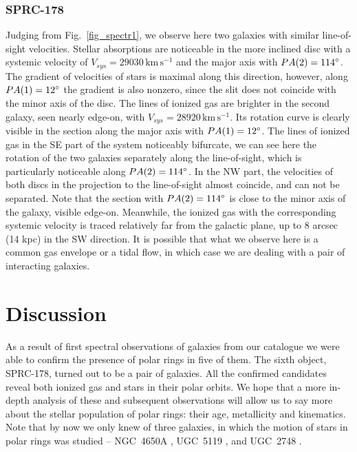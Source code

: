 \documentclass[useAMS,usenatbib]{mn2e}
\newcommand{\km}{\,\mbox{km}\,\mbox{s}^{-1}}
\begin{document}
\subsubsection{SPRC-178}

Judging from Fig.~\ref{fig_spectr1}, we observe here two galaxies
with similar line-of-sight velocities. Stellar absorptions are noticeable
in the more inclined  disc with a
systemic velocity of $V_{sys}=29030\km$ and the major axis with
$PA(2)=114\hbox{$^\circ$}$. The gradient of  velocities of stars is
maximal along this direction, however, along $PA(1)=12\hbox{$^\circ$}$ the
gradient is also nonzero, since the slit does not coincide with
the minor axis of the disc. The lines of ionized gas are brighter
in the second galaxy, seen nearly edge-on, with
$V_{sys}=28920\km$. Its rotation curve is clearly visible in the
section along the major axis with $PA(1)=12\hbox{$^\circ$}$. The lines of
ionized gas in the SE part of the system noticeably bifurcate, we
can see here the rotation of the two galaxies separately along the
line-of-sight, which is particularly noticeable along
$PA(2)=114\hbox{$^\circ$}$. In the NW part, the velocities of both discs in
the projection to the line-of-sight  almost coincide, and can
not be separated. Note that the section with $PA(2)=114\hbox{$^\circ$}$ is
close to the minor axis of the galaxy, visible edge-on. Meanwhile,
the ionized gas with the corresponding systemic velocity is traced
relatively far from the galactic plane, up to $8$ arcsec (14 kpc)
in the SW direction. It is possible that what  we observe here is a
common gas envelope or a tidal flow, in which case we are dealing
with a pair of interacting galaxies.



\section{Discussion}
\label{sec_conclusion}


As a result of first spectral observations of galaxies from our
catalogue we were able to confirm the presence of polar rings in
five of them. The sixth object, SPRC-178, turned out to be a pair
of galaxies. All the confirmed candidates reveal both ionized gas
and stars in their polar orbits. We hope that a more in-depth
analysis of these and subsequent observations will allow us to say
more about the stellar population of   polar rings: their age,
metallicity and kinematics. Note that by now we  only knew of
three galaxies, in which the motion of stars in polar rings was
studied -- NGC~4650A \citep{SwatersRubin2003}, UGC~5119
\citep{Merkulova2008}, and UGC~2748 \citep{Merkulova2009}.
\end{document}
